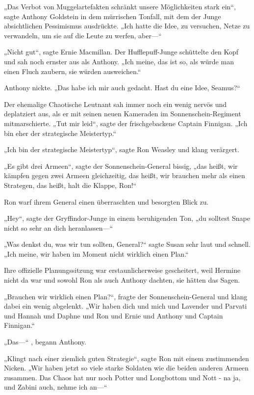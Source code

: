 {„Das Verbot von Muggelartefakten schränkt unsere Möglichkeiten stark ein“, sagte Anthony Goldstein in dem mürrischen Tonfall, mit dem der Junge absichtlichen Pessimismus ausdrückte. „Ich hatte die Idee, zu versuchen, Netze zu verwandeln, um sie auf die Leute zu werfen, aber—“

„Nicht gut“, sagte Ernie Macmillan. Der Hufflepuff-Junge schüttelte den Kopf und sah noch ernster aus als Anthony. „Ich meine, das ist so, als würde man einen Fluch zaubern, sie würden ausweichen.“

Anthony nickte. „Das habe ich mir auch gedacht. Hast du eine Idee, Seamus?“

Der ehemalige Chaotische Leutnant sah immer noch ein wenig nervös und deplatziert aus, als er mit seinen neuen Kameraden im Sonnenschein-Regiment mitmarschierte. „Tut mir leid“, sagte der frischgebackene Captain Finnigan. „Ich bin eher der strategische Meistertyp.“

„Ich bin der strategische Meistertyp“, sagte Ron Weasley und klang verärgert.

„Es gibt drei Armeen“, sagte der Sonnenschein-General bissig, „das heißt, wir kämpfen gegen zwei Armeen gleichzeitig, das heißt, wir brauchen mehr als einen Strategen, das heißt, halt die Klappe, Ron!“

Ron warf ihrem General einen überraschten und besorgten Blick zu.

„Hey“, sagte der Gryffindor-Junge in einem beruhigenden Ton, „du solltest Snape nicht so sehr an dich heranlassen—“

„Was denkst du, was wir tun sollten, General?“ sagte Susan sehr laut und schnell. „Ich meine, wir haben im Moment nicht wirklich einen Plan.“

Ihre offizielle Planungssitzung war erstaunlicherweise gescheitert, weil Hermine nicht da war und sowohl Ron als auch Anthony dachten, sie hätten das Sagen.

„Brauchen wir wirklich einen Plan?“, fragte der Sonnenschein-General und klang dabei ein wenig abgelenkt. „Wir haben dich und mich und Lavender und Parvati und Hannah und Daphne und Ron und Ernie und Anthony und Captain Finnigan.“

„Das—“ , begann Anthony.

„Klingt nach einer ziemlich guten Strategie“, sagte Ron mit einem zustimmenden Nicken. „Wir haben jetzt so viele starke Soldaten wie die beiden anderen Armeen zusammen. Das Chaos hat nur noch Potter und Longbottom und Nott - na ja, und Zabini auch, nehme ich an—“

}
